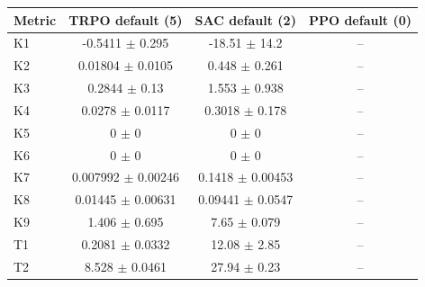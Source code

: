\begin{tabular}{lccc}
\toprule
Metric & TRPO default (5) & SAC default (2) & PPO default (0) \\
\midrule
K1 & -0.5411 $\pm$ 0.295 & -18.51 $\pm$ 14.2 & -- \\
K2 & 0.01804 $\pm$ 0.0105 & 0.448 $\pm$ 0.261 & -- \\
K3 & 0.2844 $\pm$ 0.13 & 1.553 $\pm$ 0.938 & -- \\
K4 & 0.0278 $\pm$ 0.0117 & 0.3018 $\pm$ 0.178 & -- \\
K5 & 0 $\pm$ 0 & 0 $\pm$ 0 & -- \\
K6 & 0 $\pm$ 0 & 0 $\pm$ 0 & -- \\
K7 & 0.007992 $\pm$ 0.00246 & 0.1418 $\pm$ 0.00453 & -- \\
K8 & 0.01445 $\pm$ 0.00631 & 0.09441 $\pm$ 0.0547 & -- \\
K9 & 1.406 $\pm$ 0.695 & 7.65 $\pm$ 0.079 & -- \\
T1 & 0.2081 $\pm$ 0.0332 & 12.08 $\pm$ 2.85 & -- \\
T2 & 8.528 $\pm$ 0.0461 & 27.94 $\pm$ 0.23 & -- \\
\bottomrule
\end{tabular}
